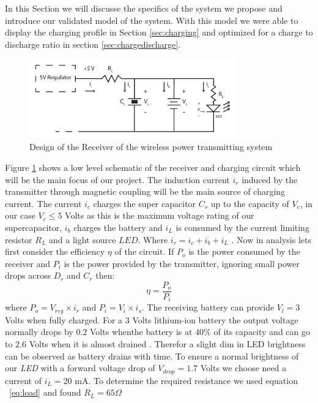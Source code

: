 %
%
In this Section we will discusse the specifics of the system we propose and introduce our validated model of the system. With this model we were able to display the charging profile in Section \ref{sec:charging} and optimized for a charge to discharge ratio in section \ref{sec:chargedischarge}.

%
\begin{figure}[h!]
\centering
\includegraphics[width=0.8\textwidth]{rec_design.pdf}
\caption{Design of the Receiver of the wireless power transmitting system}
\label{fig:rec_des}
\end{figure}
%
Figure \ref{fig:rec_des} shows a low level schematic of the receiver and charging circuit which will be the main focus of our project. The induction current $i_r$ induced by the transmitter through magnetic coupling will be the main source of charging current. The current $i_c$ charges the super capacitor $C_s$ up to the capacity of $V_c$, in our case $V_c \leq 5$ Volts as this is the maximum voltage rating of our supercapacitor, $i_b$ charges the battery and $i_L$ is consumed by the current limiting resistor $R_L$  and a light source $LED$. Where $i_r = i_c + i_b +i_L$ . Now in analysis lets first consider the efficiency ${\eta}$ of the circuit. If $P_{o}$ is the power consumed by the receiver and $P_{i}$ is the power provided by the transmitter, ignoring small power drops across $D_r$ and $C_r$  then:
\begin{equation}\label{eq:effb}
 {\eta} = \frac{P_o}{P_i}
\end{equation}
%
where $P_o = V_{reg} \times i_r $ and $P_i = V_i \times i_s $. The receiving battery can provide $V_l = 3 $ Volts when fully charged. For a 3 Volts lithium-ion battery the output voltage normally drops by $0.2 $ Volts whenthe  battery is at $40 \%$ of its capacity and can go to $2.6 $ Volts when it is almost drained \cite{IAmp}. Therefor a slight dim in LED brightness can be observed as battery drains with time. To ensure a normal brightness of our \emph{LED} with a forward voltage drop of $V_{drop} = 1.7 $ Volts we choose need a current of $i_L = 20 $ mA. To determine the required resistance we used equation ~\ref{eq:load} and found $R_L = 65 \Omega $

